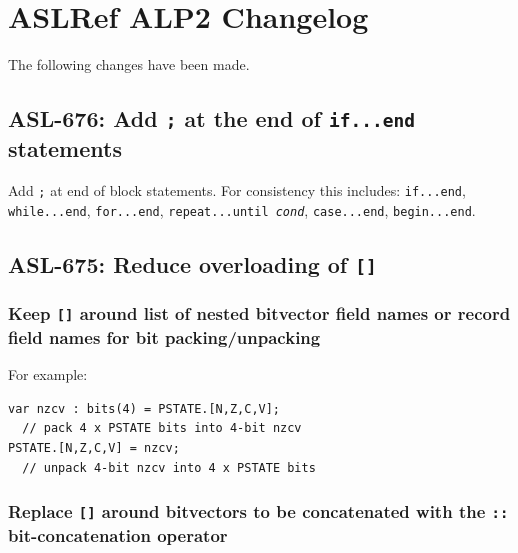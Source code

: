 



\chapter{ASLRef ALP2 Changelog}

The following changes have been made.

\section{ASL-676: Add \texttt{;} at the end of \texttt{if...end} statements}

Add \texttt{;} at end of block statements. 
For consistency this includes: \texttt{if...end}, \texttt{while...end},
\texttt{for...end}, \texttt{repeat...until \textit{cond}}, \texttt{case...end},
\texttt{begin...end}.

\section{ASL-675: Reduce overloading of \texttt{[]}}

\subsection{Keep \texttt{[]} around list of nested bitvector field
names or record field names for bit packing/unpacking}

For example:
\begin{verbatim}
var nzcv : bits(4) = PSTATE.[N,Z,C,V];  
  // pack 4 x PSTATE bits into 4-bit nzcv
PSTATE.[N,Z,C,V] = nzcv;                
  // unpack 4-bit nzcv into 4 x PSTATE bits
\end{verbatim}

\subsection{Replace \texttt{[]} around bitvectors to be concatenated
with the \texttt{::} bit-concatenation operator}

